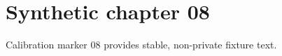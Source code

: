 \chapter{Synthetic chapter 08}\label{chap:08}
Calibration marker 08 provides stable, non-private fixture text.
